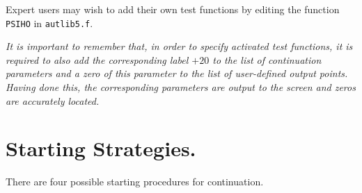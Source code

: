 \documentclass[12pt]{report}
\begin{document}
Expert users may wish to add their own test functions by editing 
the function {\tt PSIHO} in {\tt autlib5.f}.

{\it It is important to remember that, in order to specify activated 
test functions, it is required to also 
add the corresponding label $+20$ to the list of continuation
parameters and a zero of this parameter to the list of user-defined
output points. Having done this, the corresponding parameters
are output to the screen and zeros are accurately located.} 

\section{ Starting Strategies.} \label{sec:Starting_strategies}
There are four possible starting procedures for continuation. 
\end{document}
